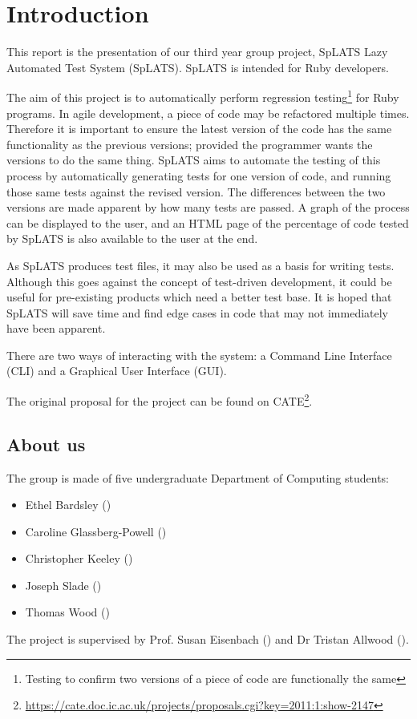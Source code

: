 \chapter{Introduction}

This report is the presentation of our third year group project, SpLATS Lazy Automated Test System (SpLATS). SpLATS is intended for Ruby developers.

The aim of this project is to automatically perform regression testing\footnote{Testing to confirm two versions of a piece of code are functionally the same} for Ruby programs. In agile development, a piece of code may be refactored multiple times. Therefore it is important to ensure the latest version of the code has the same functionality as the previous versions; provided the programmer wants the versions to do the same thing. SpLATS aims to automate the testing of this process by automatically generating tests for one version of code, and running those same tests against the revised version. The differences between the two versions are made apparent by how many tests are passed. A graph of the process can be displayed to the user, and an HTML page of the percentage of code tested by SpLATS is also available to the user at the end.

As SpLATS produces test files, it may also be used as a basis for writing tests. Although this goes against the concept of test-driven development, it could be useful for pre-existing products which need a better test base. It is hoped that SpLATS will save time and find edge cases in code that may not immediately have been apparent.

There are two ways of interacting with the system: a Command Line Interface (CLI) and a Graphical User Interface (GUI).

The original proposal for the project can be found on CATE\footnote{\url{https://cate.doc.ic.ac.uk/projects/proposals.cgi?key=2011:1:show-2147}}.

\section{About us}
  The group is made of five undergraduate Department of Computing students:
  \begin{itemize}
    \item{Ethel Bardsley ()}
    \item{Caroline Glassberg-Powell ()}
    \item{Christopher Keeley ()}
    \item{Joseph Slade ()}
    \item{Thomas Wood ()}
  \end{itemize}

  The project is supervised by Prof. Susan Eisenbach () and Dr Tristan Allwood ().
